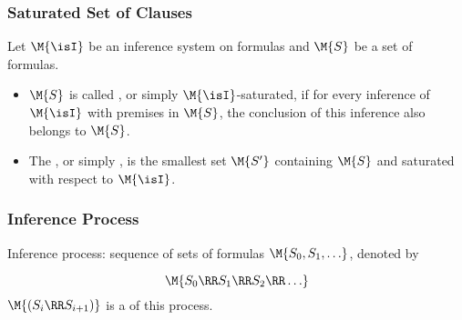 
	   \begin{frame}\frametitle{Saturated Set of Clauses}

  Let $\M{\isI}$ be an inference system on formulas and $\M{S}$ be a set of 
  formulas. 

\begin{itemize}
\item
$\M{S}$ is called ,
  or simply \alert{$\M{\isI}$-saturated},
  if for every inference of $\M{\isI}$ with premises in $\M{S}$, the conclusion
  of this inference also belongs to $\M{S}$.

\item 
The ,
  or simply ,
  is the smallest set $\M{S'}$ containing $\M{S}$ and saturated with respect to
  $\M{\isI}$.
\end{itemize}

                           \end{frame}


	   \begin{frame}\frametitle{Inference Process}

  \alert{Inference process:} sequence
  of sets of formulas $\M{S_0,S_1,\ldots}$, denoted by 

    \[
      \M{S_0 \RR S_1 \RR S_2 \RR \ldots}
    \]
  $\M{(S_i \RR S_{i+1})}$ is a  of this 
  process. 

\medskip


\medskip


                           \end{frame}

